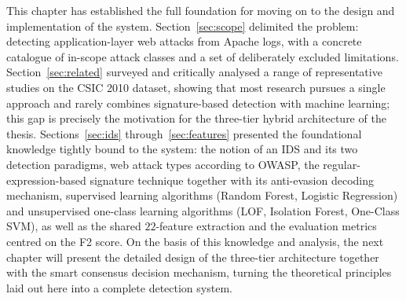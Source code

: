 This chapter has established the full foundation for moving on to the
design and implementation of the system. Section~\ref{sec:scope} delimited
the problem: detecting application-layer web attacks from Apache logs, with
a concrete catalogue of in-scope attack classes and a set of deliberately
excluded limitations. Section~\ref{sec:related} surveyed and critically
analysed a range of representative studies on the CSIC 2010 dataset,
showing that most research pursues a single approach and rarely combines
signature-based detection with machine learning; this gap is precisely the
motivation for the three-tier hybrid architecture of the thesis.
Sections~\ref{sec:ids} through~\ref{sec:features} presented the
foundational knowledge tightly bound to the system: the notion of an IDS
and its two detection paradigms, web attack types according to OWASP, the
regular-expression-based signature technique together with its
anti-evasion decoding mechanism, supervised learning algorithms (Random
Forest, Logistic Regression) and unsupervised one-class learning algorithms
(LOF, Isolation Forest, One-Class SVM), as well as the shared $22$-feature
extraction and the evaluation metrics centred on the F2 score. On the basis
of this knowledge and analysis, the next chapter will present the detailed
design of the three-tier architecture together with the smart consensus
decision mechanism, turning the theoretical principles laid out here into a
complete detection system.



